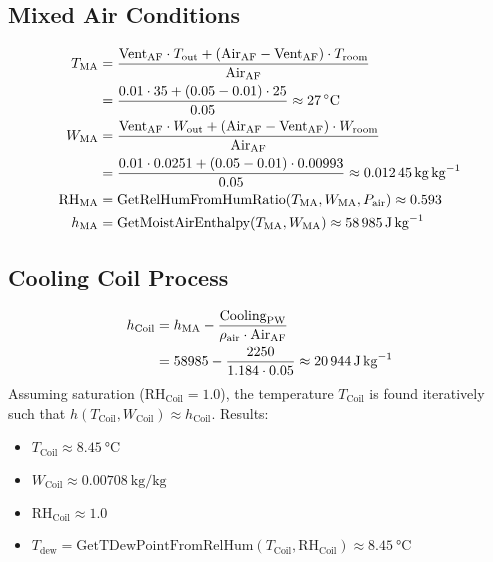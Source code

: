 \documentclass[12pt]{article}
\begin{document}
\subsection{Mixed Air Conditions}
\begin{align}
    T_{\text{MA}} &= \frac{\text{Vent}_{\text{AF}} \cdot T_{\text{out}} + (\text{Air}_{\text{AF}} - \text{Vent}_{\text{AF}}) \cdot T_{\text{room}}}{\text{Air}_{\text{AF}}} \notag \\
    &= \frac{0.01 \cdot 35 + (0.05 - 0.01) \cdot 25}{0.05} \approx \SI{27}{\celsius} \\
    W_{\text{MA}} &= \frac{\text{Vent}_{\text{AF}} \cdot W_{\text{out}} + (\text{Air}_{\text{AF}} - \text{Vent}_{\text{AF}}) \cdot W_{\text{room}}}{\text{Air}_{\text{AF}}} \notag \\
    &= \frac{0.01 \cdot 0.0251 + (0.05 - 0.01) \cdot 0.00993}{0.05} \approx \SI{0.01245}{\kilo\gram\per\kilo\gram} \\
    \text{RH}_{\text{MA}} &= \text{GetRelHumFromHumRatio}(T_{\text{MA}}, W_{\text{MA}}, P_{\text{air}}) \approx 0.593 \\
    h_{\text{MA}} &= \text{GetMoistAirEnthalpy}(T_{\text{MA}}, W_{\text{MA}}) \approx \SI{58985}{\joule\per\kilo\gram}
\end{align}

\subsection{Cooling Coil Process}
\begin{align}
    h_{\text{Coil}} &= h_{\text{MA}} - \frac{\text{Cooling}_{\text{PW}}}{\rho_{\text{air}} \cdot \text{Air}_{\text{AF}}} \notag \\
    &= 58985 - \frac{2250}{1.184 \cdot 0.05} \approx \SI{20944}{\joule\per\kilo\gram}
\end{align}
Assuming saturation (\( \text{RH}_{\text{Coil}} = 1.0 \)), the temperature \( T_{\text{Coil}} \) is found iteratively such that \( h(T_{\text{Coil}}, W_{\text{Coil}}) \approx h_{\text{Coil}} \). Results:
\begin{itemize}
    \item \( T_{\text{Coil}} \approx \SI{8.45}{\celsius} \)
    \item \( W_{\text{Coil}} \approx \SI{0.00708}{\kilo\gram\per\kilo\gram} \)
    \item \( \text{RH}_{\text{Coil}} \approx 1.0 \)
    \item \( T_{\text{dew}} = \text{GetTDewPointFromRelHum}(T_{\text{Coil}}, \text{RH}_{\text{Coil}}) \approx \SI{8.45}{\celsius} \)
\end{itemize}
\end{document}
